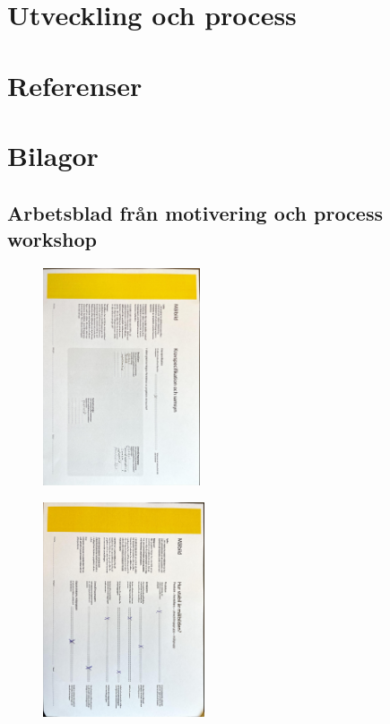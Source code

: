 \documentclass{article}
\begin{document}
\section{Utveckling och process}


\section{Referenser}

\section{Bilagor}
\subsection{Arbetsblad från motivering och process workshop}


\begin{figure}[htp]
    \centering
    \includegraphics[width = 175px,angle=90]{KS.jpg}
    \label{fig:24}
\end{figure}

\begin{figure}[htp]
    \centering
    \includegraphics[width = 180px,angle=90]{SM.jpg}
    \label{fig:24}
\end{figure}
\end{document}
